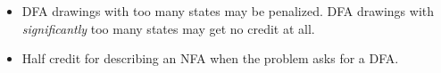 \documentclass[11pt]{article}
\begin{document}
\begin{enumerate}
\begin{rubric}
\begin{itemize}
\item
DFA drawings with too many states may be penalized.  DFA drawings with \emph{significantly} too many states may get no credit at all.

\item
Half credit for describing an NFA when the problem asks for a DFA.
\end{itemize}
\end{rubric}



\end{enumerate}
\end{document}
